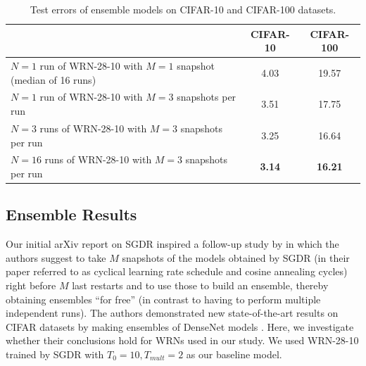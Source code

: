 \documentclass{article} %
\begin{document}
\begin{table}[t]
\renewcommand{\arraystretch}{1.2}
\begin{center}
  \begin{tabular}{ l  | c | c }
    \hline
				&  CIFAR-10 & CIFAR-100 \\ \hline
		$N=1$ run of WRN-28-10 with $M=1$ snapshot (median of 16 runs)			& 4.03 & 19.57 \\
		$N=1$ run of WRN-28-10 with $M=3$ snapshots per run  	& 3.51 & 17.75 \\
		$N=3$ runs of WRN-28-10 with $M=3$ snapshots per run  	& 3.25 & 16.64 \\
		$N=16$ runs of WRN-28-10 with $M=3$ snapshots per run  	& \textbf{3.14} & \textbf{16.21} \\
    \hline
  \end{tabular}
\end{center}
\caption{Test errors of ensemble models on CIFAR-10 and CIFAR-100 datasets.}
\end{table}



\subsection{Ensemble Results}
\label{sec:ens}
Our initial arXiv report on SGDR \citep{loshchilov2016sgdr} inspired a follow-up study by \cite{SnapshotICLR2017}  in which the authors suggest to take $M$ snapshots of the models obtained by SGDR (in their paper referred to as cyclical learning rate schedule and cosine annealing cycles) right before $M$ last restarts and to use those to build an ensemble, thereby obtaining ensembles ``for free'' (in contrast to having to perform multiple independent runs). The authors demonstrated new state-of-the-art results on CIFAR datasets by making ensembles of DenseNet models \citep{huang2016densely}. Here, we investigate whether their conclusions hold for WRNs used in our study. We used WRN-28-10 trained by SGDR with $T_0=10, T_{mult}=2$ as our baseline model.
\end{document}
